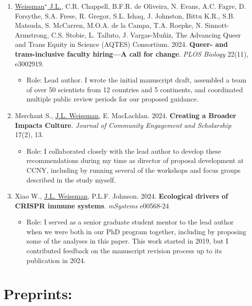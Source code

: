 \documentclass[]{res}
\begin{document}
\begin{resume}
\begin{enumerate}[leftmargin=*]
\item \underline{Weissman$^\star$ J.L.}, C.R. Chappell, B.F.R. de Oliveira, N. Evans, A.C. Fagre, D. Forsythe, S.A. Frese, R. Gregor, S.L. Ishaq, J. Johnston, Bittu K.R., S.B. Matsuda, S. McCarren, M.O.A. de la Campa, T.A. Roepke, N. Sinnott-Armstrong, C.S. Stobie, L. Talluto, J. Vargas-Muñiz, The Advancing Queer and Trans Equity in Science (AQTES) Consortium. 2024. {\bf Queer- and trans-inclusive faculty hiring—A call for change}. \emph{PLOS Biology} 22(11), e3002919.

\begin{itemize}
	\item Role: Lead author. I wrote the initial manuscript draft, assembled a team of over 50 scientists from 12 countries and 5 continents, and coordinated multiple public review periods for our proposed guidance. 
\end{itemize}
 
 \item Merchant S., \underline{J.L. Weissman}, E. MacLachlan. 2024. {\bf Creating a Broader Impacts Culture}. \emph{Journal of Community Engagement and Scholarship} 17(2), 13.
 
 \begin{itemize}
 	\item Role: I collaborated closely with the lead author to develop these recommendations during my time as director of proposal development at CCNY, including by running several of the workshops and focus groups described in the study myself.
 \end{itemize}
 
 \item Xiao W., \underline{J.L. Weissman}, P.L.F. Johnson. 2024. {\bf Ecological drivers of CRISPR immune systems}. \emph{mSystems} e00568-24
 
 \begin{itemize}
 	\item Role: I served as a senior graduate student mentor to the lead author when we were both in our PhD program together, including by proposing some of the analyses in this paper. This work started in 2019, but I contributed feedback on the manuscript revision process up to its publication in 2024.
 \end{itemize}
 
 \end{enumerate} 
 
  \section{Preprints:} \vspace{0mm}
  

\end{resume}
\end{document}
